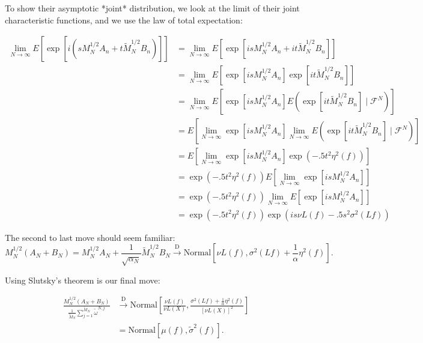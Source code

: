 \documentclass{article}
\begin{document}
To show their asymptotic *joint* distribution, we look at the limit of their joint characteristic functions, and we use the law of total expectation:

\begin{align*}
\lim_{N \to \infty}E\left[ \exp\left[i \left(sM_N^{1/2}A_n + t\tilde{M}_N^{1/2} B_n  \right) \right] \right] 
&= \lim_{N \to \infty}E\left[ \exp\left[i sM_N^{1/2}A_n + it\tilde{M}_N^{1/2} B_n   \right] \right] \\
&= \lim_{N \to \infty}E\left[ \exp\left[i sM_N^{1/2}A_n\right]\exp\left[ it\tilde{M}_N^{1/2} B_n   \right] \right] \\
&= \lim_{N \to \infty}E\left[ \exp\left[i sM_N^{1/2}A_n\right] E\left( \exp\left[ it\tilde{M}_N^{1/2} B_n   \right] \mid \mathcal{F}^N\right) \right] \\
&= E\left[ \lim_{N \to \infty}\exp\left[i sM_N^{1/2}A_n\right]\lim_{N \to \infty} E\left( \exp\left[ it\tilde{M}_N^{1/2} B_n   \right] \mid \mathcal{F}^N\right) \right] \tag{DCT} \\
&= E\left[ \lim_{N \to \infty}\exp\left[i sM_N^{1/2}A_n\right] \exp\left(-.5t^2\eta^2(f) \right) \right] \\
&= \exp\left(-.5t^2\eta^2(f) \right) E\left[ \lim_{N \to \infty}\exp\left[i sM_N^{1/2}A_n\right]  \right] \\
&= \exp\left(-.5t^2\eta^2(f) \right) \lim_{N \to \infty} E\left[ \exp\left[i sM_N^{1/2}A_n\right]  \right] \tag{DCT} \\
&= \exp\left(-.5t^2\eta^2(f) \right) \exp\left(is\nu L(f)- .5s^2\sigma^2(Lf) \right)
\end{align*}

The second to last move should seem familiar:
$$
M_N^{1/2}(A_N + B_N) = M_N^{1/2}A_N + \frac{1}{\sqrt{\alpha_N}} \tilde{M}_N^{1/2} B_N \overset{\text{D}}{\to} \text{Normal}\left[\nu L(f), \sigma^2(Lf) + \frac{1}{\alpha}\eta^2(f) \right].
$$

Using Slutsky's theorem is our final move:

\begin{align*}
\frac{M_N^{1/2}(A_N + B_N)}{\frac{1}{\tilde{M}_N} \sum_{j=1}^{\tilde{M}_N} \tilde{\omega}^{N,j}}  
&\overset{\text{D}}{\to} \text{Normal}\left[\frac{\nu L (f)}{\nu L (X)}, \frac{\sigma^2(Lf) + \frac{1}{\alpha} \eta^2(f)}{[\nu L (X) ]^2} \right] \\
&= \text{Normal}\left[\mu(f), \tilde{\sigma}^2(f) \right].
\end{align*}
\end{document}
